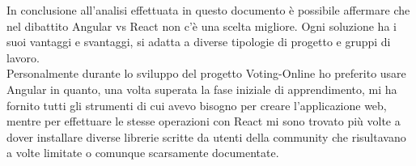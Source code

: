 In conclusione all'analisi effettuata in questo documento è possibile affermare che nel dibattito Angular vs React non c'è una scelta migliore. Ogni soluzione ha i suoi vantaggi e svantaggi, si adatta a diverse tipologie di progetto e gruppi di lavoro. \\
Personalmente durante lo sviluppo del progetto Voting-Online ho preferito usare Angular in quanto, una volta superata la fase iniziale di apprendimento, mi ha fornito tutti gli strumenti di cui avevo bisogno per creare l'applicazione web, mentre per effettuare le stesse operazioni con React mi sono trovato più volte a dover installare diverse librerie scritte da utenti della community che risultavano a volte limitate o comunque scarsamente documentate.